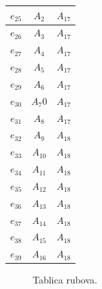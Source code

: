 \documentclass[a4paper,12pt]{article}
\begin{document}
\begin{center}
\begin{tabular}{||c | c | c ||}
         $e_{25}$ & $A_{2}$ & $A_{17}$   \\
         \hline
         $e_{26}$ & $A_{3}$  & $A_{17}$  \\
         \hline
         $e_{27}$ & $A_{4}$ & $A_{17}$  \\ 
         \hline
         $e_{28}$& $A_{5}$ & $A_{17}$  \\
         \hline
         $e_{29}$ & $A_{6}$ & $A_{17}$  \\
         \hline
         $e_{30}$ & $A_{7}$0 & $A_{17}$  \\
         \hline
         $e_{31}$ & $A_{8}$ & $A_{17}$  \\ 
         \hline
         $e_{32}$ & $A_{9}$ & $A_{18}$  \\
         \hline
         $e_{33}$ & $A_{10}$ & $A_{18}$   \\
         \hline
         $e_{34}$ & $A_{11}$ & $A_{18}$   \\
         \hline
         $e_{35}$ & $A_{12}$  &$A_{18}$  \\
         \hline
         $e_{36}$ & $A_{13}$ &$A_{18}$  \\ 
         \hline
         $e_{37}$& $A_{14}$ & $A_{18}$  \\
         \hline
         $e_{38}$ & $A_{15}$ & $A_{18}$   \\
         \hline
         $e_{39}$ & $A_{16}$ &$A_{18}$ \\[1ex] 
         
        \end{tabular}
        \end{center}
        \begin{figure}[ht]
            \centering
            \caption{Tablica rubova.}
        \end{figure}
\end{document}
